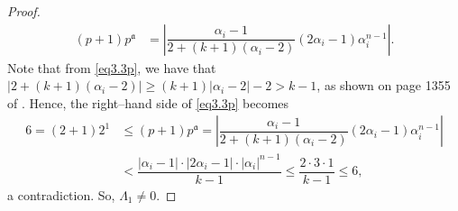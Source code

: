 \documentclass[11pt,a4paper]{article}
\numberwithin{equation}{section}
\numberwithin{table}{section}
\numberwithin{figure}{section}
\begin{document}
\begin{proof}
\begin{align}\label{eq3.3p}
	(p+1)p^\mathfrak{a}
	&=\left|\dfrac{\alpha_i-1}{2+(k+1)(\alpha_i-2)}	(2\alpha_i-1)\alpha_i^{n-1}\right|.
\end{align}
Note that from \eqref{eq3.3p}, we have that $|2+(k+1)(\alpha_i-2)|\ge (k+1)|\alpha_i-2|-2>k-1$, as shown on page 1355 of \cite{Brl}. Hence, the right--hand side of \eqref{eq3.3p} becomes
\begin{align*}
	6 =(2+1)2^1&\le (p+1)p^\mathfrak{a}=\left|\dfrac{\alpha_i-1}{2+(k+1)(\alpha_i-2)}(2\alpha_i-1)	\alpha_i^{n-1}\right| \\
	&< \dfrac{|\alpha_i-1|\cdot|2\alpha_i-1|\cdot |\alpha_i|^{n-1}}{k-1}\le\dfrac{2\cdot 3\cdot 1}{k-1}
	 \le 6,
\end{align*} 
a contradiction.  So, $\Lambda_1\ne 0$. 


\end{proof}
\end{document}
